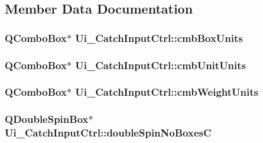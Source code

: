 \subsection{Member Data Documentation}
\hypertarget{class_ui___catch_input_ctrl_ae8f1e20253a8b76bd62f6149b758c13e}{
\subsubsection[{cmbBoxUnits}]{\setlength{\rightskip}{0pt plus 5cm}QComboBox$\ast$ {\bf Ui\_\-CatchInputCtrl::cmbBoxUnits}}}
\label{class_ui___catch_input_ctrl_ae8f1e20253a8b76bd62f6149b758c13e}
\hypertarget{class_ui___catch_input_ctrl_a02f01f7a03385a0502fbd2d6d557e9a4}{
\subsubsection[{cmbUnitUnits}]{\setlength{\rightskip}{0pt plus 5cm}QComboBox$\ast$ {\bf Ui\_\-CatchInputCtrl::cmbUnitUnits}}}
\label{class_ui___catch_input_ctrl_a02f01f7a03385a0502fbd2d6d557e9a4}
\hypertarget{class_ui___catch_input_ctrl_ac34db8d516987f86bab23d83c406fd8c}{
\subsubsection[{cmbWeightUnits}]{\setlength{\rightskip}{0pt plus 5cm}QComboBox$\ast$ {\bf Ui\_\-CatchInputCtrl::cmbWeightUnits}}}
\label{class_ui___catch_input_ctrl_ac34db8d516987f86bab23d83c406fd8c}
\hypertarget{class_ui___catch_input_ctrl_a08cd9de7440362184d996c4a693f1738}{
\subsubsection[{doubleSpinNoBoxesC}]{\setlength{\rightskip}{0pt plus 5cm}QDoubleSpinBox$\ast$ {\bf Ui\_\-CatchInputCtrl::doubleSpinNoBoxesC}}}
\label{class_ui___catch_input_ctrl_a08cd9de7440362184d996c4a693f1738}
